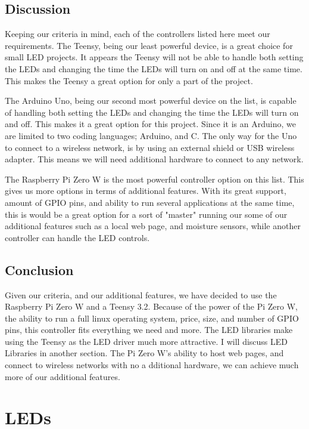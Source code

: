 \documentclass[onecolumn, draftclsnofoot,10pt, compsoc]{IEEEtran}
\begin{document}
		\subsection{Discussion}
		\noindent Keeping our criteria in mind, each of the controllers listed here meet our
		requirements. The Teensy, being our least powerful device, is a great choice
		for small LED projects. It appears the Teensy will not be able to handle
		both setting the LEDs and changing the time the LEDs will turn on and off
		at the same time. This makes the Teensy a great option for only a part of
		the project.

		\vspace{5mm}
		\noindent The Arduino Uno, being our second most powerful device on the
		list, is capable of handling both setting the LEDs and changing the time
		the LEDs will turn on and off. This makes it a great option for this
		project. Since it is an Arduino, we are limited to two coding languages;
		Arduino, and C. The only way for the Uno to connect to a wireless network,
		is by using an external shield or USB wireless adapter. This means we will
		need additional hardware to connect to any network.


		\vspace{5mm}
		\noindent The Raspberry Pi Zero W is the most powerful controller option on
		this list. This gives us more options in terms of additional
		features. With its great support, amount of GPIO pins, and ability to run
		several applications at the same time, this is would be a great option for
		a sort of "master" running our some of our additional features such as a
		local web page, and moisture sensors, while another controller can handle
		the LED controls.

		\subsection{Conclusion}
		\noindent Given our criteria, and our additional features, we have decided
		to use the Raspberry Pi Zero W and a Teensy 3.2. Because of the power of the
		Pi Zero W, the ability to run a full linux operating system, price, size,
		and number of GPIO pins, this controller fits everything we need and more.
		The LED libraries make using the Teensy as the LED driver much more
		attractive. I will discuss LED Libraries in another section. The Pi Zero
		W's ability to host web pages, and connect to wireless networks with no a
		dditional hardware, we can achieve much more of our additional features.
	\section{LEDs}
\end{document}
